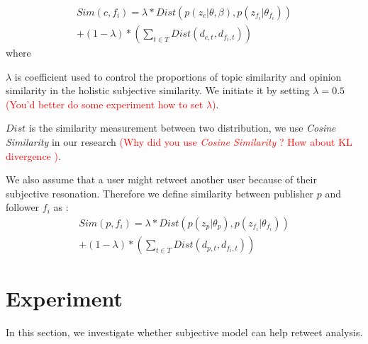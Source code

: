 \documentclass{acm_proc_article-sp}
\newcommand{\mo}[1]{\textcolor{red}{#1}}
\begin{document}
\begin{equation}
\label{tweetfollower}
\begin{split}
Sim\left( c,f_{i} \right) = \lambda \ast Dist\left( p\left( z_{c} \vert \theta, \beta \right), p\left( z_{f_{i}} \vert \theta_{f_{i}} \right) \right) \\
+\left(1-\lambda \right) \ast \left( \sum_{t \in T} Dist \left( d_{c,t}, d_{f_{i}, t} \right)  \right)
\end{split}
\end{equation}
where 
\begin{itemize*}
\item $ \lambda $ is coefficient used to control the proportions of topic similarity and opinion similarity in the holistic subjective similarity. We initiate it by setting $ \lambda =0.5 $ \mo{(You'd better do some experiment how to set  $ \lambda$)}. 
\item $ Dist $ is the similarity measurement between two distribution, we use \emph{Cosine Similarity } in our research \mo{(Why did you use \emph{Cosine Similarity }? How about KL divergence )}.
\end{itemize*}
We also assume that a user might retweet another user because of their subjective resonation. Therefore we define similarity between publisher $ p $ and follower $ f_{i} $ as :
\begin{equation}
\label{pubfollower}
\begin{split}
Sim\left( p,f_{i} \right) = \lambda \ast Dist\left( p\left( z_{p} \vert \theta_{p} \right), p\left( z_{f_{i}} \vert \theta_{f_{i}} \right) \right) \\
+\left(1-\lambda \right) \ast \left( \sum_{t \in T} Dist \left( d_{p,t}, d_{f_{i}, t} \right)  \right)
\end{split}
\end{equation}


\section{Experiment}

\label{experiment}
In this section, we investigate whether subjective model can help retweet analysis.
\end{document}

